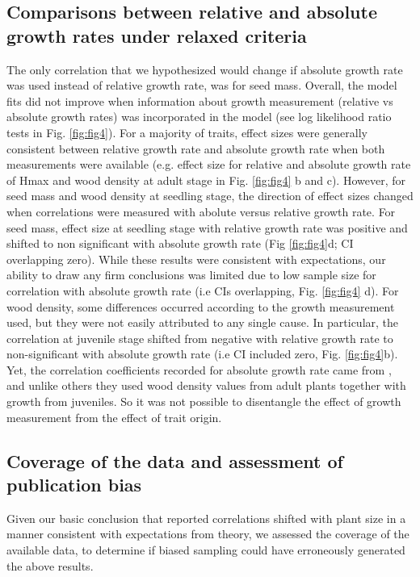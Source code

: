 \documentclass[a4paper,11pt]{article}
\begin{document}
\subsection*{Comparisons between relative and absolute growth rates under relaxed criteria}

The only correlation that we hypothesized would change if absolute growth rate was used instead of relative growth rate, was for seed mass. Overall, the model fits did not improve when information about growth measurement (relative vs absolute growth rates) was incorporated in the model (see log likelihood ratio tests in Fig. \ref{fig:fig4}). For a majority of traits, effect sizes were generally consistent between relative growth rate and absolute growth rate when both measurements were available (e.g. effect size for relative and absolute growth rate of Hmax and wood density at adult stage in Fig. \ref{fig:fig4} b and c). However, for seed mass and wood density at seedling stage, the direction of effect sizes changed when correlations were measured with abolute versus relative growth rate. For seed mass, effect size at seedling stage with relative growth rate was positive and shifted to non significant with absolute growth rate (Fig \ref{fig:fig4}d; CI overlapping zero). While these results were consistent with expectations, our ability to draw any firm conclusions was limited due to low sample size for correlation with absolute growth rate (i.e CIs overlapping, Fig. \ref{fig:fig4} d). For wood density, some differences occurred according to the growth measurement used, but they were not easily attributed to any single cause. In particular, the correlation at juvenile stage shifted from negative with relative growth rate to non-significant with absolute growth rate (i.e CI included zero, Fig. \ref{fig:fig4}b). Yet, the correlation coefficients recorded for absolute growth rate came from \citet{Augspurger:1984ct}, and unlike others they used wood density values from adult plants together with growth from juveniles. So it was not possible to disentangle the effect of growth measurement from the effect of trait origin. 


\subsection*{Coverage of the data and assessment of publication bias}

Given our basic conclusion that reported correlations shifted with plant size in a manner consistent with expectations from theory, we assessed the coverage of the available data, to determine if biased sampling could have erroneously generated the above results.
\end{document}
